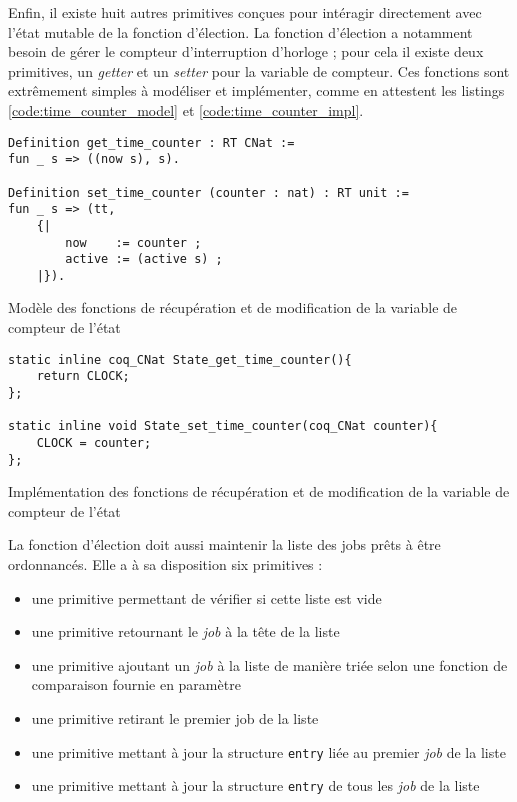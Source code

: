 	Enfin, il existe huit autres primitives conçues pour intéragir directement avec l'état mutable de la fonction d'élection. La fonction d'élection a notamment besoin de gérer le compteur d'interruption d'horloge ; pour cela il existe deux primitives, un \emph{getter} et un \emph{setter} pour la variable de compteur.
	Ces fonctions sont extrêmement simples à modéliser et implémenter, comme en attestent les listings \ref{code:time_counter_model} et \ref{code:time_counter_impl}.

	\begin{listing}[!ht]
	\begin{verbatim}
Definition get_time_counter : RT CNat :=
fun _ s => ((now s), s).

Definition set_time_counter (counter : nat) : RT unit :=
fun _ s => (tt,
    {|
        now    := counter ;
        active := (active s) ;
    |}).
	\end{verbatim}
	\caption{Modèle des fonctions de récupération et de modification de la variable de compteur de l'état}
	\label{code:time_counter_model}
	\end{listing}

	\begin{listing}[!ht]
	\begin{verbatim}
static inline coq_CNat State_get_time_counter(){
    return CLOCK;
};

static inline void State_set_time_counter(coq_CNat counter){
    CLOCK = counter;
};
	\end{verbatim}
	\caption{Implémentation des fonctions de récupération et de modification de la variable de compteur de l'état}
	\label{code:time_counter_impl}
	\end{listing}

	La fonction d'élection doit aussi maintenir la liste des jobs prêts à être ordonnancés. Elle a à sa disposition six primitives :
	\begin{itemize}
		\item une primitive permettant de vérifier si cette liste est vide
		\item une primitive retournant le \emph{job} à la tête de la liste
		\item une primitive ajoutant un \emph{job} à la liste de manière triée selon une fonction de comparaison fournie en paramètre
		\item une primitive retirant le premier job de la liste
		\item une primitive mettant à jour la structure \texttt{entry} liée au premier \emph{job} de la liste
		\item une primitive mettant à jour la structure \texttt{entry} de tous les \emph{job} de la liste
	\end{itemize}

